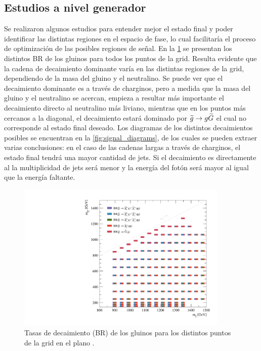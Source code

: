 \subsection{Estudios a nivel generador} %
\label{sec:susy_studies}

Se realizaron algunos estudios para entender mejor el estado final y poder
identificar las distintas regiones en el espacio de fase, lo cual facilitaría el
proceso de optimización de las posibles regiones de se\~nal. En la
\cref{fig:signal_br_gl} se presentan los distintos BR de los gluinos para todos
los puntos de la grid. Resulta evidente que la cadena de decaimiento dominante
varía en las distintas regiones de la grid, dependiendo de la masa del gluino y
el neutralino. Se puede ver que el decaimiento dominante es a través de
charginos, pero a medida que la masa del gluino y el neutralino se acercan,
empieza a resultar más importante el decaimiento directo al neutralino más
liviano, mientras que en los puntos más cercanos a la diagonal, el decaimiento
estará dominado por $\widetilde{g}\rightarrow g\widetilde{G}$ el cual no corresponde al estado
final deseado. Los diagramas de los distintos decaimientos posibles se encuentran
en la \cref{fig:signal_diagrams}, de los cuales se pueden extraer varias
conclusiones: en el caso de las cadenas largas a través de charginos, el estado
final tendrá una mayor cantidad de jets. Si el decaimiento es directamente al
{\ninoone} la multiplicidad de jets será menor y la energía del fotón será mayor
al igual que la energía faltante.


\begin{figure}[!htb]
  \centering

  \includegraphics[width=0.9\textwidth]{figures/br_gl_X}

  \caption{Tasas de decaimiento (BR) de los gluinos para los distintos puntos de la grid en
    el plano \mgmn.}
  \label{fig:signal_br_gl}
\end{figure}


